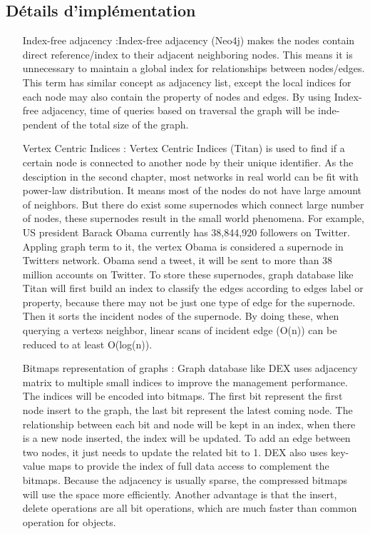   \subsection{Détails d'implémentation}
  \label{sec:graph-internals} 
  \begin{itemize}

  \item [Index-free adjacency]:Index-free adjacency (Neo4j) makes the
    nodes contain direct reference/index to their adjacent neighboring
    nodes. This means it is unnecessary to maintain a global index for
    relationships between nodes/edges. This term has similar concept
    as adjacency list, except the local indices for each node may also
    contain the property of nodes and edges.  By using Index-free
    adjacency, time of queries based on traversal the graph will be
    inde- pendent of the total size of the graph.


  \item [Vertex Centric Indices]: Vertex Centric Indices (Titan) is
    used to find if a certain node is connected to another node by
    their unique identifier. As the desciption in the second chapter,
    most networks in real world can be fit with power-law
    distribution. It means most of the nodes do not have large amount
    of neighbors. But there do exist some supernodes which connect
    large number of nodes, these supernodes result in the small world
    phenomena. For example, US president Barack Obama currently has
    38,844,920 followers on Twitter. Appling graph term to it, the
    vertex Obama is considered a supernode in Twitters network. Obama
    send a tweet, it will be sent to more than 38 million accounts on
    Twitter. To store these supernodes, graph database like Titan will
    first build an index to classify the edges according to edges
    label or property, because there may not be just one type of edge
    for the supernode. Then it sorts the incident nodes of the
    supernode. By doing these, when querying a vertexs neighbor,
    linear scans of incident edge (O(n)) can be reduced to at least
    O(log(n)).

  \item [Bitmaps representation of graphs]: Graph database like DEX
    uses adjacency matrix to multiple small indices to improve the
    management performance. The indices will be encoded into
    bitmaps. The first bit represent the first node insert to the
    graph, the last bit represent the latest coming node.  The
    relationship between each bit and node will be kept in an index,
    when there is a new node inserted, the index will be updated. To
    add an edge between two nodes, it just needs to update the related
    bit to 1. DEX also uses key-value maps to provide the index of
    full data access to complement the bitmaps. Because the adjacency
    is usually sparse, the compressed bitmaps will use the space more
    efficiently. Another advantage is that the insert, delete
    operations are all bit operations, which are much faster than
    common operation for objects.



\end{itemize}
